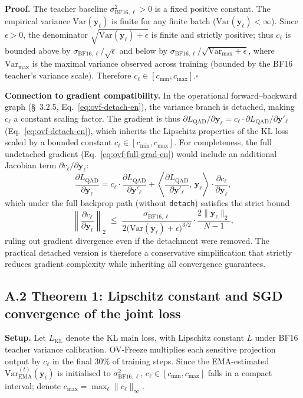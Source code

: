 \documentclass[11pt, a4paper]{article}
\begin{document}
\noindent\textbf{Proof.} The teacher baseline $\sigma^2_{\mathrm{BF16},\ell}>0$ is a fixed positive constant. The empirical variance $\mathrm{Var}(\bm{y}_\ell)$ is finite for any finite batch ($\mathrm{Var}(\bm{y}_\ell) < \infty$). Since $\epsilon>0$, the denominator $\sqrt{\mathrm{Var}(\bm{y}_\ell)+\epsilon}$ is finite and strictly positive; thus $c_\ell$ is bounded above by $\sigma_{\mathrm{BF16},\ell}/\sqrt{\epsilon}$ and below by $\sigma_{\mathrm{BF16},\ell}/\sqrt{\mathrm{Var}_{\max}+\epsilon}$, where $\mathrm{Var}_{\max}$ is the maximal variance observed across training (bounded by the BF16 teacher's variance scale). Therefore $c_\ell \in [c_{\min}, c_{\max}]$.\hfill$\square$

\medskip
\noindent\textbf{Connection to gradient compatibility.} In the operational forward--backward graph (\S~3.2.5, Eq.~\eqref{eq:ovf-detach-en}), the variance branch is detached, making $c_\ell$ a constant scaling factor. The gradient is thus $\partial L_{\mathrm{QAD}} / \partial \bm{y}_\ell = c_\ell \cdot \partial L_{\mathrm{QAD}} / \partial \bm{y}'_\ell$ (Eq.~\eqref{eq:ovf-detach-en}), which inherits the Lipschitz properties of the KL loss scaled by a bounded constant $c_\ell \in [c_{\min}, c_{\max}]$. For completeness, the full undetached gradient (Eq.~\eqref{eq:ovf-full-grad-en}) would include an additional Jacobian term $\partial c_\ell / \partial \bm{y}_\ell$:
\[
\frac{\partial L_{\mathrm{QAD}}}{\partial\bm{y}_\ell} = c_\ell\cdot\frac{\partial L_{\mathrm{QAD}}}{\partial\bm{y}'_\ell} + \left\langle\frac{\partial L_{\mathrm{QAD}}}{\partial\bm{y}'_\ell},\,\bm{y}_\ell\right\rangle\cdot\frac{\partial c_\ell}{\partial\bm{y}_\ell},
\]
which under the full backprop path (without \texttt{detach}) satisfies the strict bound
\[
\left\|\frac{\partial c_\ell}{\partial \bm{y}_\ell}\right\|_2 \;\le\; \frac{\sigma_{\mathrm{BF16},\ell}}{2\bigl(\mathrm{Var}(\bm{y}_\ell)+\epsilon\bigr)^{3/2}}\cdot\frac{2\|\bm{y}_\ell\|_2}{N-1},
\]
ruling out gradient divergence even if the detachment were removed. The practical detached version is therefore a conservative simplification that strictly reduces gradient complexity while inheriting all convergence guarantees.

\subsection*{A.2 Theorem 1: Lipschitz constant and SGD convergence of the joint loss}

\noindent\textbf{Setup.} Let $L_{\mathrm{KL}}$ denote the KL main loss, with Lipschitz constant $L$ under BF16 teacher variance calibration. OV-Freeze multiplies each sensitive projection output by $c_\ell$ in the final $30\%$ of training steps. Since the EMA-estimated $\mathrm{Var}^{(t)}_{\mathrm{EMA}}(\bm{y}_\ell)$ is initialised to $\sigma^2_{\mathrm{BF16},\ell}$, $c_\ell \in [c_{\min}, c_{\max}]$ falls in a compact interval; denote $c_{\max} = \max_\ell \|c_\ell\|_\infty$.
\end{document}
